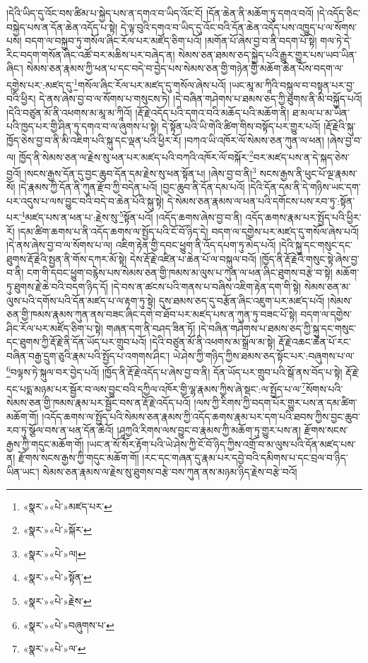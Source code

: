 །དེའི་ཡིད་དུ་འོང་བས་ཚིམ་པ་སྐྱེད་པས་ན་དགའ་བ་ཡིད་འོང་ངོ། །དོན་ཆེན་ནི་མཆོག་ཏུ་དགའ་བའོ། །དེ་འདོད་ཅིང་བསྐྱེད་པས་ན་དོན་ཆེན་འདོད་པ་སྟེ། དེ་ལྟ་བུའི་དགའ་བ་ཡིད་དུ་འོང་བའི་དོན་ཆེན་འདོད་པས་འཁྱུད་པ་ལ་སོགས་པས། བདག་ལ་བསྐྱབ་ཏུ་གསོལ་ཞིང་རོལ་པར་མཛོད་ཅིག་པའོ། །མགོན་པོ་ཞེས་བྱ་བ་ནི་བདག་པོ་སྟེ། གལ་ཏེ་དེ་རིང་བདག་གསོན་ཞིང་འཚོ་བར་མཆིས་པར་བཞེད་ན། སེམས་ཅན་ཐམས་ཅད་སྐྱེད་པའི་རྒྱུར་གྱུར་པས་ཡབ་ཡིན་ཞིང་། སེམས་ཅན་རྣམས་ཀྱི་ཕན་པ་དང་བདེ་བ་བྱེད་པས་སེམས་ཅན་གྱི་གཉེན་གྱི་མཆོག་ཆེན་པོས་བདག་ལ་དགྱེས་པར་:མཛད་དུ་\footnote{«སྣར་»«པེ་»མཛད་པར་}གསོལ་ཞིང་རོལ་པར་མཛད་དུ་གསོལ་ཞེས་པའོ། །ཡང་མཱ་མ་ཀཱིའི་བསྐུལ་བ་བསྟན་པར་བྱ་བའི་ཕྱིར། དེ་ནས་ཞེས་བྱ་བ་ལ་སོགས་པ་གསུངས་ཏེ། །དེ་བཞིན་གཤེགས་པ་ཐམས་ཅད་ཀྱི་ཐུགས་ནི་མི་བསྐྱོད་པའོ། །དེའི་བཙུན་མོ་ནི་འཕགས་མ་མཱ་མ་ཀཱིའོ། །རྡོ་རྗེ་འདོད་པའི་དགའ་བའི་མཆོད་པའི་མཆོག་ནི། ཐ་མལ་པ་མ་ཡིན་པའི་ཁྱད་པར་གྱི་ཤིན་ཏུ་དགའ་བ་ལ་ཞུགས་པ་སྟེ། དེ་སྟོན་པའི་ཡི་གེའི་ཚིག་གིས་བསྟོད་པར་གྱུར་པའོ། །རྡོ་རྗེའི་སྐུ་ཁྱོད་ཅེས་བྱ་བ་ནི་མི་འཇིག་པའི་སྐུ་དང་ལྡན་པའི་ཕྱིར་རོ། །བཀའ་ཡི་འཁོར་ལོ་སེམས་ཅན་ཀུན་ལ་ཕན། །ཞེས་བྱ་བ་ལ། ཁྱོད་ནི་སེམས་ཅན་ལ་རྗེས་སུ་ཕན་པར་མཛད་པའི་བཀའི་འཁོར་ལོ་བསྐོར་\footnote{«སྣར་»«པེ་»སྐོར་}བར་མཛད་པས་ན་དེ་སྐད་ཅེས་བྱའོ། །སངས་རྒྱས་དོན་དུ་བྱང་ཆུབ་དོན་དམ་རྗེས་སུ་ཕན་སྟོན་པ། །ཞེས་བྱ་བ་ནི།\footnote{«སྣར་»«པེ་»ལ།} སངས་རྒྱས་ནི་ཕུང་པོ་ལྔ་རྣམས་སོ། །དེ་རྣམས་ཀྱི་དོན་ནི་ཀུན་རྫོབ་ཀྱི་བདེན་པའོ། །བྱང་ཆུབ་ནི་དོན་དམ་པའོ། །དེའི་དོན་དམ་ནི་དེ་གཉིས་ཡང་དག་པར་འདུས་པ་ལས་བྱུང་བའི་བདེ་བ་ཆེན་པོའི་སྐུ་སྟེ། དེ་སེམས་ཅན་རྣམས་ལ་ཕན་པའི་དགོངས་པས་རབ་ཏུ་:སྟོན་པར་\footnote{«སྣར་»«པེ་»སྟོན་}མཛད་པས་ན་ཕན་པ་:རྗེས་སུ་\footnote{«སྣར་»«པེ་»རྗེས་}སྟོན་པའོ། །འདོད་ཆགས་ཞེས་བྱ་བ་ནི། འདོད་ཆགས་རྣམ་པར་སྤྱོད་པའི་ཕྱིར་རོ། །དམ་ཚིག་ཆགས་པ་ནི་འདོད་ཆགས་ལ་སྤྱོད་པའི་ངོ་བོ་ཉིད་དེ། བདག་ལ་དགྱེས་པར་མཛད་དུ་གསོལ་ཞེས་པའོ། །དེ་ནས་ཞེས་བྱ་བ་ལ་སོགས་པ་ལ། འཇིག་རྟེན་གྱི་དབང་ཕྱུག་ནི་འོད་དཔག་ཏུ་མེད་པའོ། །དེའི་སྐུ་དང་གསུང་དང་ཐུགས་རྡོ་རྗེའི་སྤྱན་ནི་གོས་དཀར་མོ་སྟེ། དེས་རྡོ་རྗེ་འཛིན་པ་ཆེན་པོ་ལ་བསྐུལ་བའོ། །ཁྱོད་ནི་རྡོ་རྗེའི་གསུང་སྟེ་ཞེས་བྱ་བ་ནི། ངག་གི་དབང་ཕྱུག་བརྙེས་པས་སེམས་ཅན་གྱི་ཁམས་མ་ལུས་པ་ཀུན་ལ་ཕན་ཞིང་ཐུགས་བརྩེ་བ་སྟེ། མཆོག་ཏུ་ཐུགས་རྗེ་ཆེ་བའི་བདག་ཉིད་དོ། །དེ་བས་ན་ཚངས་པའི་གནས་པ་བཞིས་འཇིག་རྟེན་དག་གི་སྟེ། སེམས་ཅན་མ་ལུས་པའི་དགོས་པའི་དོན་མཛད་པ་ལ་རྟག་ཏུ་སྟེ། དུས་ཐམས་ཅད་དུ་བརྩོན་ཞིང་འཇུག་པར་མཛད་པའོ། །སེམས་ཅན་གྱི་ཁམས་རྣམས་ཀུན་ནས་བཟང་ཞིང་དགེ་བ་ཐོབ་པར་མཛད་པས་ན་ཀུན་ཏུ་བཟང་པོ་སྟེ། བདག་ལ་དགྱེས་ཤིང་རོལ་པར་མཛོད་ཅིག་པ་སྟེ། གཞན་དག་ནི་བཤད་ཟིན་ཏོ། །དེ་བཞིན་གཤེགས་པ་ཐམས་ཅད་ཀྱི་སྐུ་དང་གསུང་དང་ཐུགས་ཀྱི་རྡོ་རྗེ་ནི་དོན་ཡོད་པར་གྲུབ་པའོ། །དེའི་བཙུན་མོ་ནི་འཕགས་མ་སྒྲོལ་མ་སྟེ། རྡོ་རྗེ་འཆང་ཆེན་པོ་རང་བཞིན་བརྒྱ་དྲུག་ཅུའི་རྣམ་པའི་སྤྱོད་པ་འགགས་ཤིང་། ཡེ་ཤེས་ཀྱི་གཉིད་ཀྱིས་ཐམས་ཅད་སྟོང་པར་:བཞུགས་པ་ལ་\footnote{«སྣར་»«པེ་»བཞུགས་པ་}བལྟས་ཏེ་སྐུལ་བར་བྱེད་པའོ། །ཁྱོད་ནི་རྡོ་རྗེ་འདོད་པ་ཞེས་བྱ་བ་ནི། དོན་ཡོད་པར་གྲུབ་པའི་སྒོ་ནས་བོད་པ་སྟེ། རྡོ་རྗེ་དང་པདྨ་མཉམ་པར་སྦྱོར་བ་ལས་བྱུང་བའི་དཀྱིལ་འཁོར་གྱི་ལྷ་རྣམས་ཀྱིས་ཞེ་སྡང་:ལ་སྤྱོད་པ་ལ་\footnote{«སྣར་»«པེ་»ལ་}སོགས་པའི་སེམས་ཅན་གྱི་ཁམས་རྣམ་པར་སྦྱོང་བས་ན་རྡོ་རྗེ་འདོད་པའོ། །ལས་ཀྱི་རིགས་ཀྱི་བདག་པོར་གྱུར་པས་ན་དམ་ཚིག་མཆོག་གོ། །འདོད་ཆགས་ལ་སྤྱོད་པའི་སེམས་ཅན་རྣམས་ཀྱི་འདོད་ཆགས་རྣམ་པར་དག་པའི་ཐབས་ཀྱིས་བྱང་ཆུབ་རབ་ཏུ་སྩོལ་བས་ན་ཕན་དོན་ཆེའོ། །ཤཱཀྱའི་རིགས་ལས་བྱུང་བ་རྣམས་ཀྱི་མཆོག་ཏུ་གྱུར་པས་ན། རྫོགས་སངས་རྒྱས་ཀྱི་གདུང་མཆོག་གོ། །ཡང་ན་སོ་སོར་རྟོག་པའི་ཡེ་ཤེས་ཀྱི་ངོ་བོ་ཉིད་ཀྱིས་འགྲོ་བ་མ་ལུས་པའི་དོན་མཛད་པས་ན། རྫོགས་སངས་རྒྱས་ཀྱི་གདུང་མཆོག་གོ། །རང་དང་གཞན་དུ་རྣམ་པར་དབྱེ་བའི་དམིགས་པ་དང་བྲལ་བ་ཉིད་ཡིན་ཡང་། སེམས་ཅན་རྣམས་ལ་རྗེས་སུ་ཐུགས་བརྩེ་བས་ཀུན་ནས་མཉམ་ཉིད་རྗེས་བརྩེ་བའོ། 